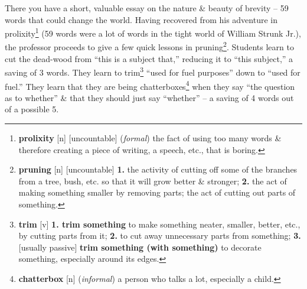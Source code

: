 \documentclass{article}
\begin{document}
There you have a short, valuable essay on the nature \& beauty of brevity -- 59 words that could change the world. Having recovered from his adventure in prolixity\footnote{{\bf prolixity} [n] [uncountable] ({\it formal}) the fact of using too many words \& therefore creating a piece of writing, a speech, etc., that is boring.} (59 words were a lot of words in the tight world of William Strunk Jr.), the professor proceeds to give a few quick lessons in pruning\footnote{{\bf pruning} [n] [uncountable] {\bf 1.} the activity of cutting off some of the branches from a tree, bush, etc. so that it will grow better \& stronger; {\bf 2.} the act of making something smaller by removing parts; the act of cutting out parts of something.}. Students learn to cut the dead-wood from ``this is a subject that,'' reducing it to ``this subject,'' a saving of 3 words. They learn to trim\footnote{{\bf trim} [v] {\bf 1. trim something} to make something neater, smaller, better, etc., by cutting parts from it; {\bf 2.} to cut away unnecessary parts from something; {\bf 3.} [usually passive] {\bf trim something (with something)} to decorate something, especially around its edges.} ``used for fuel purposes'' down to ``used for fuel.'' They learn that they are being chatterboxes\footnote{{\bf chatterbox} [n] ({\it informal}) a person who talks a lot, especially a child.} when they say ``the question as to whether'' \& that they should just say ``whether'' -- a saving of 4 words out of a possible 5.
\end{document}
